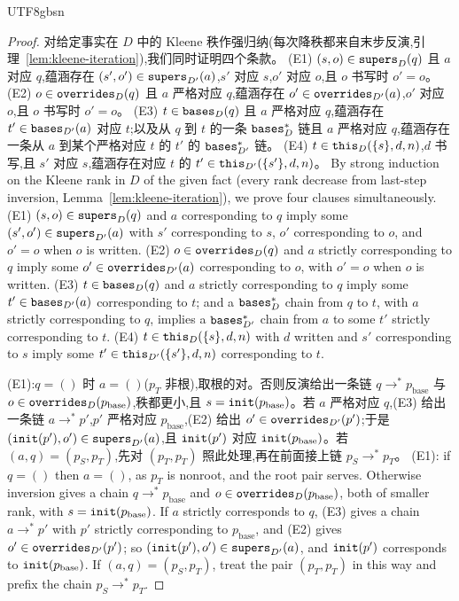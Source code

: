 \begin{CJK*}{UTF8}{gbsn}
\begin{proof}
\ifPaperChinese
对给定事实在 $D$ 中的 Kleene 秩作强归纳(每次降秩都来自末步反演,引理~\ref{lem:kleene-iteration}),我们同时证明四个条款。
(E1) $(s, o) \in \mathtt{supers}_D(q)$ 且 $a$ 对应 $q$,蕴涵存在 $(s', o') \in \mathtt{supers}_{D'}(a)$,$s'$ 对应 $s$,$o'$ 对应 $o$,且 $o$ 书写时 $o' = o$。
(E2) $o \in \mathtt{overrides}_D(q)$ 且 $a$ 严格对应 $q$,蕴涵存在 $o' \in \mathtt{overrides}_{D'}(a)$,$o'$ 对应 $o$,且 $o$ 书写时 $o' = o$。
(E3) $t \in \mathtt{bases}_D(q)$ 且 $a$ 严格对应 $q$,蕴涵存在 $t' \in \mathtt{bases}_{D'}(a)$ 对应 $t$;以及从 $q$ 到 $t$ 的一条 $\mathtt{bases}^*_D$ 链且 $a$ 严格对应 $q$,蕴涵存在一条从 $a$ 到某个严格对应 $t$ 的 $t'$ 的 $\mathtt{bases}^*_{D'}$ 链。
(E4) $t \in \mathtt{this}_D(\{s\}, d, n)$,$d$ 书写,且 $s'$ 对应 $s$,蕴涵存在对应 $t$ 的 $t' \in \mathtt{this}_{D'}(\{s'\}, d, n)$。
\else
By strong induction on the Kleene rank in $D$ of the given fact (every rank decrease from last-step
inversion, Lemma~\ref{lem:kleene-iteration}), we prove four clauses simultaneously.
(E1) $(s, o) \in \mathtt{supers}_D(q)$ and $a$ corresponding to $q$ imply some
$(s', o') \in \mathtt{supers}_{D'}(a)$ with $s'$ corresponding to $s$, $o'$ corresponding to $o$, and $o' = o$
when $o$ is written.
(E2) $o \in \mathtt{overrides}_D(q)$ and $a$ strictly corresponding to $q$ imply some
$o' \in \mathtt{overrides}_{D'}(a)$ corresponding to $o$, with $o' = o$ when $o$ is written.
(E3) $t \in \mathtt{bases}_D(q)$ and $a$ strictly corresponding to $q$ imply some $t' \in \mathtt{bases}_{D'}(a)$
corresponding to $t$; and a $\mathtt{bases}^*_D$ chain from $q$ to $t$, with $a$ strictly corresponding to $q$,
implies a $\mathtt{bases}^*_{D'}$ chain from $a$ to some $t'$ strictly corresponding to $t$.
(E4) $t \in \mathtt{this}_D(\{s\}, d, n)$ with $d$ written and $s'$ corresponding to $s$ imply some
$t' \in \mathtt{this}_{D'}(\{s'\}, d, n)$ corresponding to $t$.
\fi

\ifPaperChinese
(E1):$q = ()$ 时 $a = ()$($p_T$ 非根),取根的对。否则反演给出一条链 $q \to^* p_{\mathrm{base}}$ 与 $o \in \mathtt{overrides}_D(p_{\mathrm{base}})$,秩都更小,且 $s = \mathtt{init}(p_{\mathrm{base}})$。若 $a$ 严格对应 $q$,(E3) 给出一条链 $a \to^* p'$,$p'$ 严格对应 $p_{\mathrm{base}}$,(E2) 给出 $o' \in \mathtt{overrides}_{D'}(p')$;于是 $(\mathtt{init}(p'), o') \in \mathtt{supers}_{D'}(a)$,且 $\mathtt{init}(p')$ 对应 $\mathtt{init}(p_{\mathrm{base}})$。若 $(a, q) = (p_S, p_T)$,先对 $(p_T, p_T)$ 照此处理,再在前面接上链 $p_S \to^* p_T$。
\else
(E1): if $q = ()$ then $a = ()$, as $p_T$ is nonroot, and the root pair serves. Otherwise inversion gives
a chain $q \to^* p_{\mathrm{base}}$ and $o \in \mathtt{overrides}_D(p_{\mathrm{base}})$, both of smaller rank,
with $s = \mathtt{init}(p_{\mathrm{base}})$. If $a$ strictly corresponds to $q$, (E3) gives a chain $a \to^* p'$
with $p'$ strictly corresponding to $p_{\mathrm{base}}$, and (E2) gives $o' \in \mathtt{overrides}_{D'}(p')$; so
$(\mathtt{init}(p'), o') \in \mathtt{supers}_{D'}(a)$, and $\mathtt{init}(p')$ corresponds to $\mathtt{init}(p_{\mathrm{base}})$. If
$(a, q) = (p_S, p_T)$, treat the pair $(p_T, p_T)$ in this way and prefix the chain $p_S \to^* p_T$.
\fi


\end{proof}
\end{CJK*}

